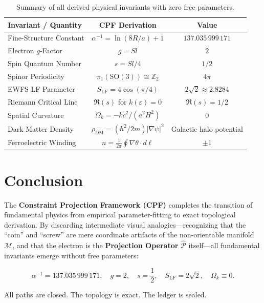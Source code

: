 \documentclass[11pt, a4paper, twocolumn]{article}
\theoremstyle{plain}
\theoremstyle{definition}
\begin{document}
\begin{table}[h]
\centering
\scriptsize
\begin{tabular}{lcc}
\toprule
\textbf{Invariant / Quantity} & \textbf{CPF Derivation} & \textbf{Value} \\
\midrule
Fine-Structure Constant & $\alpha^{-1} = \ln(8R/a) + 1$ & $137.035\,999\,171$ \\
Electron $g$-Factor & $g = Sl$ & $2$ \\
Spin Quantum Number & $s = Sl/4$ & $1/2$ \\
Spinor Periodicity & $\pi_1(\mathrm{SO}(3)) \cong \mathbb{Z}_2$ & $4\pi$ \\
EWFS LF Parameter & $S_{\mathrm{LF}} = 4\cos(\pi/4)$ & $2\sqrt{2} \approx 2.8284$ \\
Riemann Critical Line & $\Re(s)$ for $k(\varepsilon)=0$ & $\Re(s)=1/2$ \\
Spatial Curvature & $\Omega_k = -k c^2/(a^2 H^2)$ & $0$ \\
Dark Matter Density & $\rho_{\mathrm{DM}} = (\hbar^2/2m)|\nabla\psi|^2$ & Galactic halo potential \\
Ferroelectric Winding & $n = \frac{1}{2\pi}\oint \nabla\theta\cdot d\ell$ & $\pm 1$ \\
\bottomrule
\end{tabular}
\caption{Summary of all derived physical invariants with zero free parameters.}
\label{tab:summary}
\end{table}

\section{Conclusion}
\label{sec:conclusion}

The \textbf{Constraint Projection Framework (CPF)} completes the transition of fundamental physics from empirical parameter-fitting to exact topological derivation. By discarding intermediate visual analogies---recognizing that the ``coin'' and ``screw'' are mere coordinate artifacts of the non-orientable manifold $\mathcal{M}$, and that the electron is the \textbf{Projection Operator} $\hat{\mathcal{P}}$ itself---all fundamental invariants emerge without free parameters:

\[
\boxed{\alpha^{-1} = 137.035\,999\,171},\quad
\boxed{g = 2},\quad
\boxed{s = \frac{1}{2}},\quad
\boxed{S_{\mathrm{LF}} = 2\sqrt{2}},\quad
\boxed{\Omega_k \equiv 0}.
\]

All paths are closed. The topology is exact. The ledger is sealed.
\end{document}
